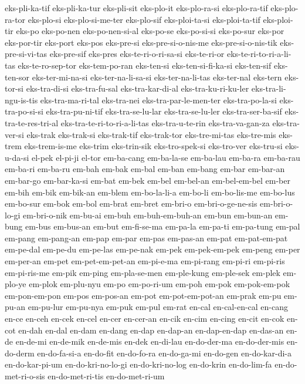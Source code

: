 {eks-pli-ka-tif eks-pli-ka-tur eks-pli-sit eks-plo-it eks-plo-ra-si
eks-plo-ra-tif eks-plo-ra-tor eks-plo-si eks-plo-si-me-ter eks-plo-sif
eks-ploi-ta-si eks-ploi-ta-tif eks-ploi-tir eks-po eks-po-nen
eks-po-nen-si-al eks-po-se eks-po-si-si eks-po-sur eks-por eks-por-tir
eks-port eks-pos eks-pre-si eks-pre-si-o-nis-me eks-pre-si-o-nis-tik
eks-pre-si-vi-tas eks-pre-sif eks-pres eks-te-ri-o-ri-sa-si eks-te-ri-or
eks-te-ri-to-ri-a-li-tas eks-te-ro-sep-tor eks-tem-po-ran eks-ten-si
eks-ten-si-fi-ka-si eks-ten-sif eks-ten-sor eks-ter-mi-na-si
eks-ter-na-li-sa-si eks-ter-na-li-tas eks-ter-nal eks-tern eks-tor-si
eks-tra-di-si eks-tra-fu-sal eks-tra-kar-di-al eks-tra-ku-ri-ku-ler
eks-tra-li-ngu-is-tis eks-tra-ma-ri-tal eks-tra-nei eks-tra-par-le-men-ter
eks-tra-po-la-si eks-tra-po-si-si eks-tra-pu-ni-tif eks-tra-se-lu-lar
eks-tra-se-lu-ler eks-tra-ser-ba-sif eks-tra-te-res-tri-al
eks-tra-te-ri-to-ri-a-li-tas eks-tra-u-te-rin eks-tra-va-gan-za
eks-tra-ver-si eks-trak eks-trak-si eks-trak-tif eks-trak-tor
eks-tre-mi-tas eks-tre-mis eks-trem eks-trem-is-me eks-trim eks-trin-sik
eks-tro-spek-si eks-tro-ver eks-tru-si eks-u-da-si el-pek el-pi-ji el-tor
em-ba-cang em-ba-la-se em-ba-lau em-ba-ra em-ba-rau em-ba-ri em-ba-ru
em-bah em-bak em-bal em-ban em-bang em-bar em-bar-an em-bar-go
em-bar-ka-si em-bat em-bek em-bel em-bel-an em-bel-em-bel em-ber em-bih
em-bik em-bik-an em-blem em-bo-la-li-a em-bo-li em-bo-lis-me em-bo-lus
em-bo-sur em-bok em-bol em-brat em-bret em-bri-o em-bri-o-ge-ne-sis
em-bri-o-lo-gi em-bri-o-nik em-bu-ai em-buh em-buh-em-buh-an em-bun
em-bun-an em-bung em-bus em-bus-an em-but em-fi-se-ma em-pa-la em-pa-ti
em-pa-tung em-pal em-pang em-pang-an em-pap em-par em-pas em-pas-an em-pat
em-pat-em-pat em-pe-dal em-pe-du em-pe-las em-pe-nak em-pek em-pek-em-pek
em-peng em-per em-per-an em-pet em-pet-em-pet-an em-pi-e-ma em-pi-rang
em-pi-ri em-pi-ris em-pi-ris-me em-pik em-ping em-pla-se-men em-ple-kung
em-ple-sek em-plek em-plo-ye em-plok em-plu-nyu em-po em-po-ri-um em-poh
em-pok em-pok-em-pok em-pon-em-pon em-pos em-pos-an em-pot
em-pot-em-pot-an em-prak em-pu em-pu-an em-pu-lur em-pu-nya em-puk em-pul
em-rat en-cal en-cal-en-cal en-cang en-ce en-ceh en-cek en-cel en-cer
en-cer-an en-cik en-cim en-cing en-cit en-cok en-cot en-dah en-dal en-dam
en-dang en-dap en-dap-an en-dap-en-dap en-das-an en-de en-de-mi en-de-mik
en-de-mis en-dek en-di-lau en-do-der-ma en-do-der-mis en-do-derm
en-do-fa-si-a en-do-fit en-do-fo-ra en-do-ga-mi en-do-gen en-do-kar-di-a
en-do-kar-pi-um en-do-kri-no-lo-gi en-do-kri-no-log en-do-krin
en-do-lim-fa en-do-met-ri-o-sis en-do-met-ri-tis en-do-met-ri-um
}
